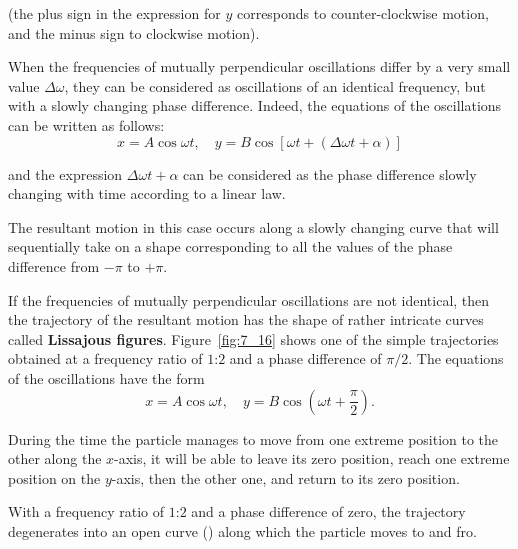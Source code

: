 \noindent
(the plus sign in the expression for $y$ corresponds to counter-clockwise motion, and the minus sign to clockwise motion).

When the frequencies of mutually perpendicular oscillations differ by a very small value $\Delta\omega$, they can be considered as oscillations of an identical frequency, but with a slowly changing phase difference. Indeed, the equations of the oscillations can be written as follows:
\begin{equation*}
	x = A\cos\omega t,\quad y = B\cos[\omega t + (\Delta\omega t + \alpha)]
\end{equation*}

\noindent
and the expression $\Delta\omega t + \alpha$ can be considered as the phase difference slowly changing with time according to a linear law.

The resultant motion in this case occurs along a slowly changing curve that will sequentially take on a shape corresponding to all the values of the phase difference from $-\pi$ to $+\pi$.

If the frequencies of mutually perpendicular oscillations are not identical, then the trajectory of the resultant motion has the shape of rather intricate curves called \textbf{Lissajous figures}. Figure~\ref{fig:7_16} shows one of the simple trajectories obtained at a frequency ratio of $1$:$2$ and a phase difference of $\pi/2$. The equations of the oscillations have the form
\begin{equation*}
	x = A\cos\omega t,\quad y = B\cos\left(\omega t + \frac{\pi}{2}\right).
\end{equation*}

\noindent
During the time the particle manages to move from one  extreme position to the other along the $x$-axis, it will be able to leave its zero position, reach one extreme position on the $y$-axis, then the other one, and return to its zero position.

With a frequency ratio of $1$:$2$ and a phase difference of zero, the trajectory degenerates into an open curve () along which the particle moves to and fro.

